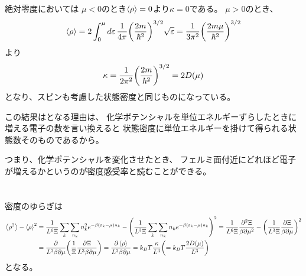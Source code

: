 \documentclass[../ap_2011.tex]{subfiles}
\begin{document}

絶対零度においては
\(\mu<0\)のとき\(\ev{\rho}=0\)より\(\kappa=0\)である。
\(\mu>0\)のとき、
\begin{equation}\begin{aligned}[b]
    \ev{\rho} = 2\int_0^\mu d\varepsilon\, \frac{1}{4\pi}\qty(\frac{2m}{\hbar^2})^{3/2}\sqrt{\varepsilon}
    =\frac{1}{3\pi^2}\qty(\frac{2m\mu}{\hbar^2})^{3/2}
\end{aligned}\end{equation}
より
\begin{equation}\begin{aligned}[b]
    \kappa = \frac{1}{2\pi^2}\qty(\frac{2m}{\hbar^2})^{3/2}=2D(\mu)
\end{aligned}\end{equation}
となり、スピンも考慮した状態密度と同じものになっている。

この結果はとなる理由は、
化学ポテンシャルを単位エネルギーずらしたときに増える電子の数を言い換えると
状態密度に単位エネルギーを掛けて得られる状態数そのものであるから。

つまり、化学ポテンシャルを変化させたとき、
フェルミ面付近にどれほど電子が増えるかというのが密度感受率と読むことができる。

\section{}
密度のゆらぎは
\begin{equation}\begin{aligned}[b]
    \ev{\rho^2}-\ev{\rho}^2
    &=\frac{1}{L^6\Xi}\sum_k\sum_{n_k}n_k^2e^{-\beta(\varepsilon_k-\mu)n_k}-\qty(\frac{1}{L^3\Xi}\sum_k\sum_{n_k}n_ke^{-\beta(\varepsilon_k-\mu)n_k})^2
    =\frac{1}{L^6\Xi}\frac{\partial^2\Xi}{\beta\partial\mu^2}-\qty(\frac{1}{L^3\Xi}\frac{\partial\Xi}{\beta\partial\mu})^2\\
    &=\frac{\partial}{L^3\beta\partial\mu}\qty(\frac{1}{\Xi}\frac{\partial \Xi}{L^3\beta\partial\mu})
    =\frac{\partial\ev{\rho}}{L^3\beta\partial\mu} = k_BT\frac{\kappa}{L^3} \qty(= k_BT \frac{2D(\mu)}{L^3})
\end{aligned}\end{equation}
となる。
\end{document}
